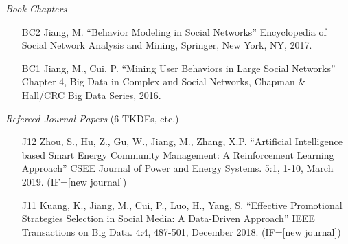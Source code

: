 \documentclass[10pt]{article}
\newenvironment{myindentpar}[1]%
{\begin{list}{}%
         {\setlength{\leftmargin}{#1}}%
         \item[]%
}
{\end{list}}
\newcounter{list}
\begin{document}
\begin{myindentpar}{0.00cm}

\hspace{-0.25cm}\emph{Book Chapters}

\begin{enumerate}[leftmargin=.5cm]

\item[BC2] Jiang, M. ``Behavior Modeling in Social Networks'' Encyclopedia of Social Network Analysis and Mining, Springer, New York, NY, 2017.
		
\item[BC1] Jiang, M., Cui, P. ``Mining User Behaviors in Large Social Networks'' Chapter 4, Big Data in Complex and Social Networks, Chapman \& Hall/CRC Big Data Series, 2016.

\vspace{-0.1cm}

\end{enumerate}

\hspace{-0.25cm}\emph{Refereed Journal Papers} (6 TKDEs, etc.)

\begin{enumerate}[leftmargin=.5cm]

\item[J12] Zhou, S., Hu, Z., Gu, W., Jiang, M., Zhang, X.P. ``Artificial Intelligence based Smart Energy Community Management: A Reinforcement Learning Approach'' CSEE Journal of Power and Energy Systems. 5:1, 1-10, March 2019. (IF=[new journal])

\vspace{-0.1cm}

\item[J11] Kuang, K., Jiang, M., Cui, P., Luo, H., Yang, S. ``Effective Promotional Strategies Selection in Social Media: A Data-Driven Approach'' IEEE Transactions on Big Data. 4:4, 487-501, December 2018. (IF=[new journal])

\vspace{-0.1cm}


\end{enumerate}
\end{myindentpar}
\end{document}
